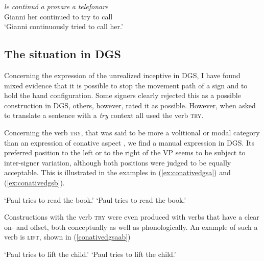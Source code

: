 \begin{exe}
\ex {} {\textit{le}} {\textit{continuó}} {\textit{a}} {\textit{provare}} {\textit{a}} {\textit{telefonare}} \\
{Gianni} {her} {continued} {to} {try} {to} {call} \\
\trans `Gianni continuously tried to call her.' \label{ex:cinqueconative}
\end{exe} 

\subsection{The situation in DGS}
\noindent Concerning the expression of the unrealized inceptive in DGS, I have found mixed evidence that it is possible to stop the movement path of a sign and to hold the hand configuration. Some signers clearly rejected this as a possible construction in DGS, others, however, rated it as possible. However, when asked to translate a sentence with a \textit{try} context all used the verb \textsc{try}.


Concerning the verb \textsc{try}, that was said to be more a volitional or modal category than an expression of conative aspect \citep[568]{signgram2017}, we find a manual expression in DGS. Its preferred position to the left or to the right of the VP seems to be subject to inter-signer variation, although both positions were judged to be equally acceptable. This is illustrated in the examples in (\ref{ex:conativedgsa}) and (\ref{ex:conativedgsb}). 

\begin{exe}
\ex  \label{conativedgs}\begin{xlist} 
\glt `Paul tries to read the book.' \label{ex:conativedgsa}
\glt `Paul tries to read the book.' \label{ex:conativedgsb}
\end{xlist}
\end{exe} 

\noindent Constructions with the verb \textsc{try} were even produced with verbs that have a clear on- and offset, both conceptually as well as phonologically. An example of such a verb is \textsc{lift}, shown in (\ref{conativedgsaab})

\begin{exe}
\ex  \label{conativedgsaab}\begin{xlist} 
\glt `Paul tries to lift the child.' \label{ex:conativedgsaa}
\glt `Paul tries to lift the child.' \label{ex:conativedgsbb}
\end{xlist}
\end{exe} 

